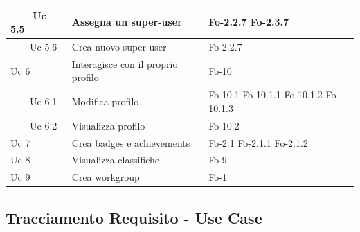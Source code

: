 {{\begin{longtable}{|p{3.5cm}|p{6.5cm}|p{3cm}|}
\hline
\ \ \ \ Uc 5.5 & Assegna un super-user & Fo-2.2.7 \newline Fo-2.3.7\\
\hline
\ \ \ \ Uc 5.6 & Crea nuovo super-user & Fo-2.2.7 \\
\hline
Uc 6 & Interagisce con il proprio profilo & Fo-10\\
\hline
\ \ \ \ Uc 6.1 & Modifica profilo & Fo-10.1 \newline Fo-10.1.1 \newline Fo-10.1.2 \newline Fo-10.1.3\\
\hline
\ \ \ \ Uc 6.2 & Visualizza profilo & Fo-10.2\\
\hline
Uc 7 & Crea badges e achievements & Fo-2.1 \newline Fo-2.1.1 \newline Fo-2.1.2\\
\hline
Uc 8 & Visualizza classifiche & Fo-9\\
\hline
Uc 9 & Crea workgroup & Fo-1\\

\end{longtable}

\newpage

\subsection{Tracciamento Requisito - Use Case}

}}
